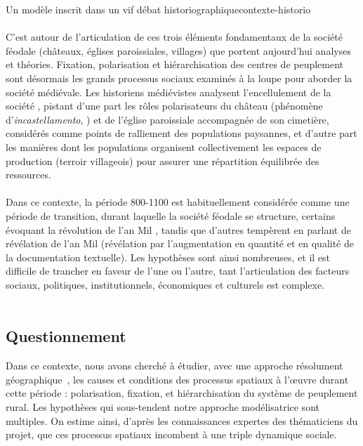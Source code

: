 \begin{encadre}{Un modèle inscrit dans un vif débat historiographique}{contexte-historio}
\paragraph[espace]{}
C'est autour de l'articulation de ces trois éléments fondamentaux de la société féodale (châteaux, églises paroissiales, villages) que portent aujourd'hui analyses et théories.
Fixation, polarisation et hiérarchisation des centres de peuplement sont désormais les grands processus sociaux examinés à la loupe pour aborder la société médiévale.
Les historiens médiévistes analysent l'\og encellulement\fg{} de la société \autocite{fossier_enfance_1982}, pistant d'une part les rôles polarisateurs du château (phénomène d'\textit{incastellamento}, \cite{toubert_les_1973}) et de l'église paroissiale accompagnée de son cimetière, considérés comme points de ralliement des populations paysannes, et d'autre part les manières dont les populations organisent collectivement les espaces de production (terroir villageois) pour assurer une répartition équilibrée des ressources.

\paragraph[espace]{}
Dans ce contexte, la période 800-1100 est habituellement considérée comme une période de transition, durant laquelle la société féodale se structure, certains évoquant la \og révolution de l'an Mil\fg{} \autocite{fossier_enfance_1982}, tandis que d'autres tempèrent en parlant de \og révélation de l'an Mil\fg{} \autocite{barthelemy_societe_1993} (\og révélation\fg{} par l'augmentation en quantité et en qualité de la documentation textuelle).
Les hypothèses sont ainsi nombreuses, et il est difficile de trancher en faveur de l'une ou l'autre, tant l'articulation des facteurs sociaux, politiques, institutionnels, économiques et culturels est complexe.
\fg{}\\
\mbox{}~ \hfill \cite[301-302]{cura_transition_2017} 
\end{encadre}

\subsection{Questionnement}

Dans ce contexte, nous avons cherché à étudier, avec une approche \og résolument géographique\fg{}~\autocite[302]{cura_transition_2017}, les causes et conditions des processus spatiaux à l'œuvre durant cette période : polarisation, fixation, et hiérarchisation du système de peuplement rural.
Les hypothèses qui sous-tendent notre approche modélisatrice sont multiples.
On estime ainsi, d'après les connaissances expertes des thématiciens du projet, que ces processus spatiaux incombent à une triple dynamique sociale.


